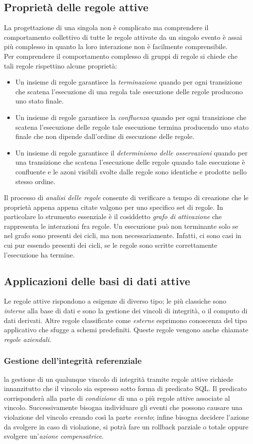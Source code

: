 \subsection{Proprietà delle regole attive}
La progettazione di una singola non è complicato ma comprendere il comportamento collettivo di tutte le regole attivate da un singolo evento è assai più complesso in quanto la loro interazione non è facilmente comprensibile.\\
Per comprendere il comportamento complesso di gruppi di regole si chiede che tali regole rispettino alcune proprietà:
\begin{itemize}
\item Un insieme di regole garantisce la \emph{terminazione} quando  per ogni transizione che scatena l'esecuzione di una regola tale esecuzione delle regole producono uno stato finale.
\item Un insieme di regole garantisce la \emph{confluenza} quando per ogni transizione che scatena l'esecuzione delle regole tale esecuzione termina producendo uno stato finale che non dipende dall'ordine di esecuzione delle regole.
\item Un insieme di regole garantisce il \emph{determinismo delle osservazioni} quando per una transizione che scatena l'esecuzione delle regole quando tale esecuzione è confluente e le azoni visibili svolte dalle regole sono identiche e prodotte nello stesso ordine.
\end{itemize}
Il processo di \emph{analisi delle regole} consente di verificare a tempo di creazione che le proprietà appena appena citate valgono per uno specifico set di regole. In particolare lo strumento essenziale è il cosiddetto \emph{grafo di attivazione} che rappresenta le interazioni fra regole. Un esecuzione può non terminante solo se nel grafo sono presenti dei cicli, ma non necessariamente. Infatti, ci sono casi in cui pur essendo presenti dei cicli, se le regole sono scritte correttamente l'esecuzione ha termine.
\subsection{Applicazioni delle basi di dati attive}
Le regole attive rispondono a esigenze di diverso tipo; le più classiche sono \emph{interne} alla base di dati e sono la gestione dei vincoli di integrità, o il computo di dati derivati. Altre regole classificate come \emph{esterne} esprimono conoscenza del tipo applicativo che sfugge a schemi predefiniti.
Queste regole vengono anche chiamate \emph{regole aziendali}.
\subsubsection{Gestione dell'integrità referenziale}
la gestione di un qualunque vincolo di integrità tramite regole attive richiede innanzitutto che il vincolo sia espresso sotto forma di predicato SQL.
Il predicato corrisponderà alla parte di \emph{condizione} di una o più regole attive associate al vincolo. Successivamente bisogna individuare gli eventi che possono causare una violazione del vincolo creando così la parte \emph{evento};
infine bisogna decidere l'azione da svolgere in caso di violazione, si potrà fare un rollback parziale o totale oppure svolgere un'\emph{azione compensatrice}.
